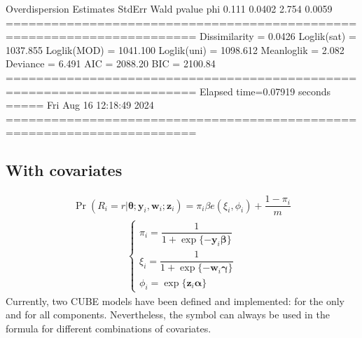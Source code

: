 \documentclass[letterpaper,10pt,english]{sphinxmanual}
\begin{document}
\begin{sphinxVerbatim}[commandchars=\\\{\}]
Overdispersion
     Estimates  StdErr    Wald  p\PYGZhy{}value
phi      0.111  0.0402   2.754   0.0059
=======================================================================
Dissimilarity = 0.0426
Loglik(sat)   = \PYGZhy{}1037.855
Loglik(MOD)   = \PYGZhy{}1041.100
Loglik(uni)   = \PYGZhy{}1098.612
Mean\PYGZhy{}loglik   = \PYGZhy{}2.082
Deviance      = 6.491
\PYGZhy{}\PYGZhy{}\PYGZhy{}\PYGZhy{}\PYGZhy{}\PYGZhy{}\PYGZhy{}\PYGZhy{}\PYGZhy{}\PYGZhy{}\PYGZhy{}\PYGZhy{}\PYGZhy{}\PYGZhy{}\PYGZhy{}\PYGZhy{}\PYGZhy{}\PYGZhy{}\PYGZhy{}\PYGZhy{}\PYGZhy{}\PYGZhy{}\PYGZhy{}\PYGZhy{}\PYGZhy{}\PYGZhy{}\PYGZhy{}\PYGZhy{}\PYGZhy{}\PYGZhy{}\PYGZhy{}\PYGZhy{}\PYGZhy{}\PYGZhy{}\PYGZhy{}\PYGZhy{}\PYGZhy{}\PYGZhy{}\PYGZhy{}\PYGZhy{}\PYGZhy{}\PYGZhy{}\PYGZhy{}\PYGZhy{}\PYGZhy{}\PYGZhy{}\PYGZhy{}\PYGZhy{}\PYGZhy{}\PYGZhy{}\PYGZhy{}\PYGZhy{}\PYGZhy{}\PYGZhy{}\PYGZhy{}\PYGZhy{}\PYGZhy{}\PYGZhy{}\PYGZhy{}\PYGZhy{}\PYGZhy{}\PYGZhy{}\PYGZhy{}\PYGZhy{}\PYGZhy{}\PYGZhy{}\PYGZhy{}\PYGZhy{}\PYGZhy{}\PYGZhy{}\PYGZhy{}
AIC = 2088.20
BIC = 2100.84
=======================================================================
Elapsed time=0.07919 seconds =====\PYGZgt{}\PYGZgt{}\PYGZgt{} Fri Aug 16 12:18:49 2024
=======================================================================
\end{sphinxVerbatim}

\noindent{}


\subsection{With covariates}
\label{\detokenize{manual:cube-with-covariates}}\label{\detokenize{manual:id197}}
\sphinxAtStartPar
{}

\sphinxAtStartPar
{}
\begin{equation*}
\begin{split}\Pr(R_i=r|\pmb{\theta};\pmb y_i, \pmb w_i; \pmb z_i) = \pi_i \beta e(\xi_i,\phi_i)+\dfrac{1-\pi_i}{m}\end{split}
\end{equation*}\begin{equation*}
\begin{split}\left\{
\begin{array}{l}
    \pi_i = \dfrac{1}{1+\exp\{ -\pmb y_i \pmb\beta\}}
    \\
    \xi_i = \dfrac{1}{1+\exp\{ -\pmb w_i \pmb\gamma\}}
    \\
    \phi_i = \exp\{ \pmb z_i \pmb \alpha \}
\end{array}
\right.\end{split}
\end{equation*}
\sphinxAtStartPar
Currently, two CUBE models have been defined and implemented:
for the  only and for all components.
Nevertheless, the symbol  can always be used in the
formula for different combinations of covariates.
\end{document}
